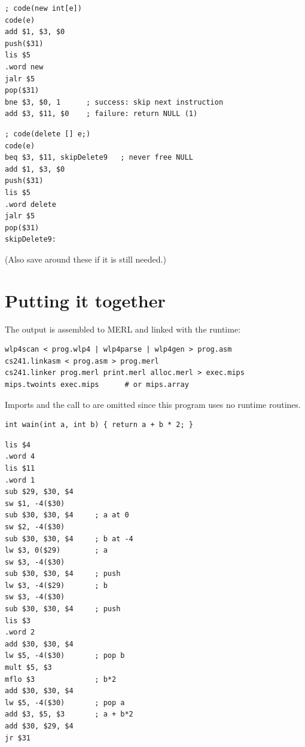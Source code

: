 \begin{lstlisting}[style=mips]
; code(new int[e])
code(e)
add $1, $3, $0
push($31)
lis $5
.word new
jalr $5
pop($31)
bne $3, $0, 1      ; success: skip next instruction
add $3, $11, $0    ; failure: return NULL (1)
\end{lstlisting}
\begin{lstlisting}[style=mips]
; code(delete [] e;)
code(e)
beq $3, $11, skipDelete9   ; never free NULL
add $1, $3, $0
push($31)
lis $5
.word delete
jalr $5
pop($31)
skipDelete9:
\end{lstlisting}
(Also save  around these if it is still needed.)

\section{Putting it together}

The output is assembled to MERL and linked with the runtime:
\begin{lstlisting}[style=bash]
wlp4scan < prog.wlp4 | wlp4parse | wlp4gen > prog.asm
cs241.linkasm < prog.asm > prog.merl
cs241.linker prog.merl print.merl alloc.merl > exec.mips
mips.twoints exec.mips      # or mips.array
\end{lstlisting}

\begin{example}
Imports and the call to  are omitted since this program uses no runtime routines.
\begin{lstlisting}[style=cpp]
int wain(int a, int b) { return a + b * 2; }
\end{lstlisting}
\begin{lstlisting}[style=mips]
lis $4
.word 4
lis $11
.word 1
sub $29, $30, $4
sw $1, -4($30)
sub $30, $30, $4     ; a at 0
sw $2, -4($30)
sub $30, $30, $4     ; b at -4
lw $3, 0($29)        ; a
sw $3, -4($30)
sub $30, $30, $4     ; push
lw $3, -4($29)       ; b
sw $3, -4($30)
sub $30, $30, $4     ; push
lis $3
.word 2
add $30, $30, $4
lw $5, -4($30)       ; pop b
mult $5, $3
mflo $3              ; b*2
add $30, $30, $4
lw $5, -4($30)       ; pop a
add $3, $5, $3       ; a + b*2
add $30, $29, $4
jr $31
\end{lstlisting}
\end{example}

